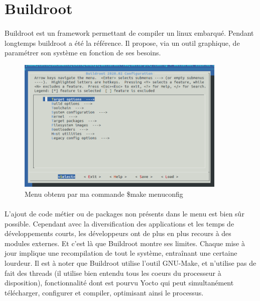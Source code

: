 \section{Buildroot}
\paragraph{}
Buildroot est un framework permettant de compiler un linux embarqué. Pendant longtemps buildroot a été la référence. Il propose, via un outil graphique, de paramétrer son système en fonction de ses besoins.

\begin{figure}[!h]
    \center
    \includegraphics[width=10cm]{Images/menuconfig.png}
    \caption{Menu obtenu par ma commande \$make menuconfig}
\end{figure}

\paragraph{}
L'ajout de code métier ou de packages non présents dans le menu est bien sûr possible.
Cependant avec la diversification des applications et les temps de développements courts, les développeurs ont de plus en plus recours à des modules externes. Et c'est là que Buildroot montre ses limites. Chaque mise à jour implique une recompilation de tout le système, entraînant une certaine lourdeur. Il est à noter que Buildroot utilise l'outil GNU-Make, et n'utilise pas de fait des threads (il utilise bien entendu tous les coeurs du processeur à disposition), fonctionnalité dont est pourvu Yocto qui peut simultanément télécharger, configurer et compiler, optimisant ainsi le processus.



